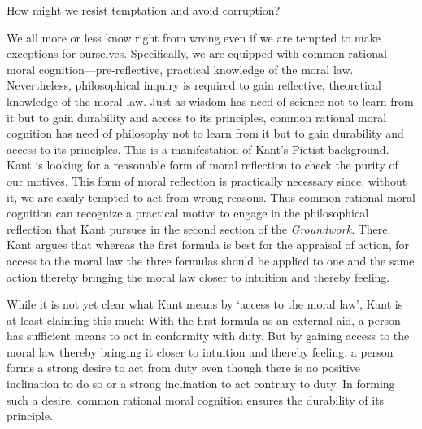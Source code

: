 \documentclass[12pt]{article}
\begin{document}
How might we resist temptation and avoid corruption?

We all more or less know right from wrong even if we are tempted to make exceptions for ourselves. Specifically, we are equipped with common rational moral cognition---pre-reflective, practical knowledge of the moral law. Nevertheless, philosophical inquiry is required to gain reflective, theoretical knowledge of the moral law. Just as wisdom has need of science not to learn from it but to gain durability and access to its principles, common rational moral cognition has need of philosophy not to learn from it but to gain durability and access to its principles. This is a manifestation of Kant's Pietist background. Kant is looking for a reasonable form of moral reflection to check the purity of our motives. This form of moral reflection is practically necessary since, without it, we are easily tempted to act from wrong reasons. Thus common rational moral cognition can recognize a practical motive to engage in the philosophical reflection that Kant pursues in the second section of the \emph{Groundwork}. There, Kant argues that whereas the first formula is best for the appraisal of action, for access to the moral law the three formulas should be applied to one and the same action thereby bringing the moral law closer to intuition and thereby feeling.

While it is not yet clear what Kant means by `access to the moral law', Kant is at least claiming this much: With the first formula as an external aid, a person has sufficient means to act in conformity with duty. But by gaining access to the moral law thereby bringing it closer to intuition and thereby feeling, a person forms a strong desire to act from duty even though there is no positive inclination to do so or a strong inclination to act contrary to duty. In forming such a desire, common rational moral cognition ensures the durability of its principle.
\end{document}

